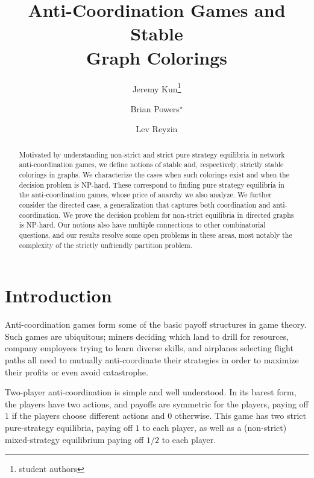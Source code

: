 \documentclass{llncs}
\title{Anti-Coordination Games and Stable \\Graph Colorings}
\begin{document}
\author{Jeremy Kun\thanks{student authors} \and Brian Powers$^\star$ \and Lev Reyzin}


\maketitle


\begin{abstract}
Motivated by understanding non-strict and strict pure strategy equilibria
in network anti-coordination games, we define notions of stable and, respectively, strictly
stable colorings in graphs.  We characterize the cases when such colorings exist and when
the decision problem is NP-hard. These correspond to finding pure strategy equilibria in the anti-coordination games, whose price of anarchy we also analyze.  
We further consider the directed case, a generalization that captures both coordination and anti-coordination. We prove the decision problem for non-strict equilibria in directed graphs is NP-hard.
Our notions also have multiple connections to other combinatorial questions, and
our results resolve some open problems in these areas, 
most notably the complexity of the strictly unfriendly partition problem.
\end{abstract}

\section{Introduction}

Anti-coordination games form some of the basic payoff structures in game
theory.  Such games are ubiquitous; miners deciding which land to drill for
resources, company employees trying to learn diverse skills, and airplanes
selecting flight paths all need to mutually anti-coordinate their strategies in
order to maximize their profits or even avoid catastrophe.

Two-player anti-coordination is simple and well understood.  In its barest
form, the players have two actions, and payoffs are symmetric for the players,
paying off $1$ if the players choose different actions and $0$ otherwise.  This
game has two strict pure-strategy equilibria, paying off $1$ to each player, as
well as a (non-strict) mixed-strategy equilibrium paying off $1/2$ to each
player.
\end{document}
